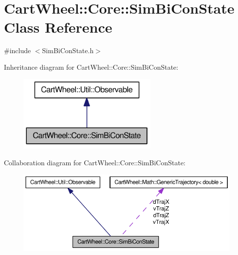 \hypertarget{classCartWheel_1_1Core_1_1SimBiConState}{
\section{CartWheel::Core::SimBiConState Class Reference}
\label{classCartWheel_1_1Core_1_1SimBiConState}
}


{\ttfamily \#include $<$SimBiConState.h$>$}



Inheritance diagram for CartWheel::Core::SimBiConState:\nopagebreak
\begin{figure}[H]
\begin{center}
\leavevmode
\includegraphics[width=196pt]{classCartWheel_1_1Core_1_1SimBiConState__inherit__graph}
\end{center}
\end{figure}


Collaboration diagram for CartWheel::Core::SimBiConState:\nopagebreak
\begin{figure}[H]
\begin{center}
\leavevmode
\includegraphics[width=400pt]{classCartWheel_1_1Core_1_1SimBiConState__coll__graph}
\end{center}
\end{figure}
